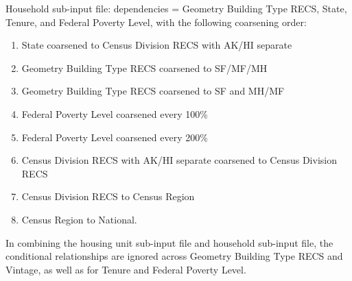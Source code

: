 Household sub-input file: dependencies = Geometry Building Type RECS, State, Tenure, and Federal Poverty Level, with the following coarsening order:

\begin{enumerate}
    \item State coarsened to Census Division RECS with AK/HI separate 
    \item  Geometry Building Type RECS coarsened to SF/MF/MH 
    \item  Geometry Building Type RECS coarsened to SF and MH/MF
    \item  Federal Poverty Level coarsened every 100\% 
    \item Federal Poverty Level coarsened every 200\% 
    \item  Census Division RECS with AK/HI separate coarsened to Census Division RECS
    \item Census Division RECS to Census Region
    \item Census Region to National. 
\end{enumerate}

In combining the housing unit sub-input file and household sub-input file, the conditional relationships are ignored across Geometry Building Type RECS and Vintage, as well as for Tenure and Federal Poverty Level.
